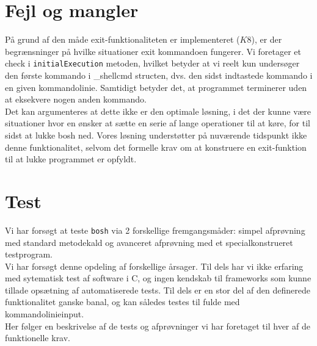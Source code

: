 \documentclass{article}
\begin{document}
\section{Fejl og mangler}
\label{sec:fm}
På grund af den måde exit-funktionaliteten er implementeret ($K8$), er der begrænsninger på hvilke situationer exit kommandoen fungerer. Vi foretager et check i \texttt{initialExecution} metoden, hvilket betyder at vi reelt kun undersøger den første kommando i \_shellcmd structen, dvs. den sidst indtastede kommando i en given kommandolinie. Samtidigt betyder det, at programmet terminerer uden at eksekvere nogen anden kommando.\\

Det kan argumenteres at dette ikke er den optimale løsning, i det der kunne være situationer hvor en ønsker at sætte en serie af lange operationer til at køre, for til sidst at lukke bosh ned. Vores løsning understøtter på nuværende tidspunkt ikke denne funktionalitet, selvom det formelle krav om at konstruere en exit-funktion til at lukke programmet er opfyldt.

\section{Test}
Vi har forsøgt at teste \texttt{bosh} via 2 forskellige fremgangsmåder: simpel afprøvning med standard metodekald og avanceret afprøvning med et specialkonstrueret testprogram.\\

Vi har forsøgt denne opdeling af forskellige årsager. Til dels har vi ikke erfaring med sytematisk test af software i C, og ingen kendskab til frameworks som kunne tillade opsætning af automatiserede tests. Til dels er en stor del af den definerede funktionalitet ganske banal, og kan således testes til fulde med kommandolinieinput.\\

Her følger en beskrivelse af de tests og afprøvninger vi har foretaget til hver af de funktionelle krav.
\end{document}
